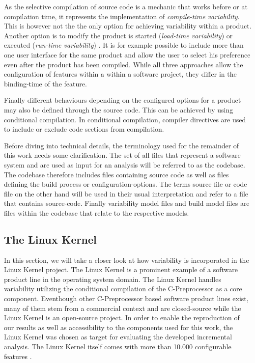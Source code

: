 \documentclass[a4paper]{article}
\begin{document}
As the selective compilation of source code is a mechanic that works before or at compilation time, it represents the implementation of \emph{compile-time variability}. This is however not the the only option for achieving variability within a product. Another option is to modify the product is started (\emph{load-time variability}) or executed (\emph{run-time variability}) \cite[p.49]{Apel:2013:FSP:2541773}. It is for example possible to include more than one user interface for the same product and allow the user to select his preference even after the product has been compiled. While all three approaches allow the configuration of features within a within a software project, they differ in the binding-time of the feature. 

Finally different behaviours depending on the configured options for a product may also be defined through the source code. This can be achieved by using conditional compilation. In conditional compilation, compiler directives are used to include or exclude code sections from compilation. 

Before diving into technical details, the terminology used for the remainder of this work needs some clarification. The set of all files  that represent a software system and are used as input for an analysis will be referred to as the codebase. The codebase therefore includes files containing source code as well as files defining the build process or configuration-options. The terms source file or code file on the other hand will be used in their usual interpretation and refer to a file that contains source-code. Finally variability model files and build model files are files within the codebase that relate to the respective models. 

\subsection{The Linux Kernel}\label{linux-kernel}

In this section, we will take a closer look at how variability is incorporated in the Linux Kernel project. The Linux Kernel is a prominent example of a software product line in the operating system domain. The Linux Kernel handles variability utilizing the conditional compilation of the C-Preprocessor as a core component.  Eventhough other C-Preprocessor based software product lines exist, many of them stem from a commercial context and are closed-source while the Linux Kernel is an open-source project. In order to enable the reproduction of our results as well as accessibility to the components used for this work, the Linux Kernel was chosen as target for evaluating the developed incremental analysis. The Linux Kernel itself comes with more than 10.000 configurable features \cite{Tartler:2011:FCC:1966445.1966451}. 
\end{document}
